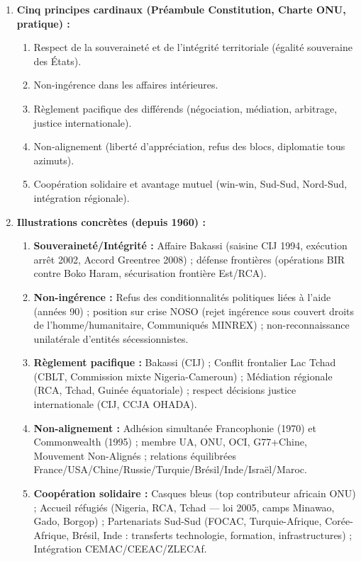 \documentclass[11pt]{article}
\newcommand{\cle}[1]{{\popxbold\color{popdark}#1}}
\begin{document}
\begin{corrige}
\begin{enumerate}
    \item \textbf{Cinq principes cardinaux (Préambule Constitution, Charte ONU, pratique) :}
    \begin{enumerate}
        \item Respect de la \cle{souveraineté} et de l'\cle{intégrité territoriale} (égalité souveraine des États).
        \item \cle{Non-ingérence} dans les affaires intérieures.
        \item \cle{Règlement pacifique des différends} (négociation, médiation, arbitrage, justice internationale).
        \item \cle{Non-alignement} (liberté d'appréciation, refus des blocs, diplomatie tous azimuts).
        \item \cle{Coopération solidaire} et \cle{avantage mutuel} (win-win, Sud-Sud, Nord-Sud, intégration régionale).
    \end{enumerate}
    \item \textbf{Illustrations concrètes (depuis 1960) :}
    \begin{enumerate}
        \item \textbf{Souveraineté/Intégrité :} Affaire \cle{Bakassi} (saisine CIJ 1994, exécution arrêt 2002, Accord Greentree 2008) ; défense frontières (opérations BIR contre Boko Haram, sécurisation frontière Est/RCA).
        \item \textbf{Non-ingérence :} Refus des conditionnalités politiques liées à l'aide (années 90) ; position sur crise NOSO (rejet ingérence sous couvert droits de l'homme/humanitaire, Communiqués MINREX) ; non-reconnaissance unilatérale d'entités sécessionnistes.
        \item \textbf{Règlement pacifique :} \cle{Bakassi} (CIJ) ; \cle{Conflit frontalier Lac Tchad} (CBLT, Commission mixte Nigeria-Cameroun) ; \cle{Médiation} régionale (RCA, Tchad, Guinée équatoriale) ; respect décisions justice internationale (CIJ, CCJA OHADA).
        \item \textbf{Non-alignement :} Adhésion simultanée \cle{Francophonie} (1970) et \cle{Commonwealth} (1995) ; membre \cle{UA}, \cle{ONU}, \cle{OCI}, \cle{G77+Chine}, \cle{Mouvement Non-Alignés} ; relations équilibrées France/USA/Chine/Russie/Turquie/Brésil/Inde/Israël/Maroc.
        \item \textbf{Coopération solidaire :} \cle{Casques bleus} (top contributeur africain ONU) ; \cle{Accueil réfugiés} (Nigeria, RCA, Tchad — loi 2005, camps Minawao, Gado, Borgop) ; \cle{Partenariats Sud-Sud} (FOCAC, Turquie-Afrique, Corée-Afrique, Brésil, Inde : transferts technologie, formation, infrastructures) ; \cle{Intégration CEMAC/CEEAC/ZLECAf}.

\end{enumerate}
\end{enumerate}
\end{corrige}
\end{document}
